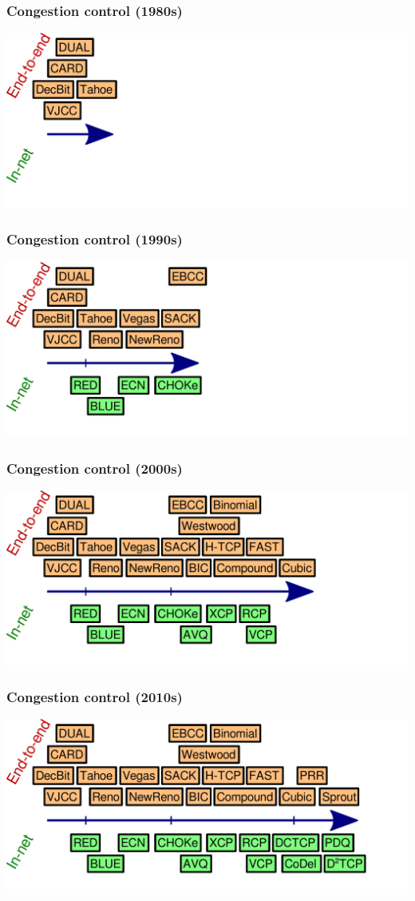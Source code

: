 \documentclass[svgnames]{beamer}
\begin{document}
\begin{frame}
\frametitle{Congestion control (1980s)}
\noindent \hspace{-.75 cm} \includegraphics[width=1.1\textwidth]{march-4.pdf}
\end{frame}
\begin{frame}
\frametitle{Congestion control (1990s)}
\noindent \hspace{-.75 cm} \includegraphics[width=1.1\textwidth]{march-3.pdf}
\end{frame}
\begin{frame}
\frametitle{Congestion control (2000s)}
\noindent \hspace{-.75 cm} \includegraphics[width=1.1\textwidth]{march-2.pdf}
\end{frame}
\begin{frame}
\frametitle{Congestion control (2010s)}
\noindent \hspace{-.75 cm} \includegraphics[width=1.1\textwidth]{march-1.pdf}
\end{frame}
\end{document}
